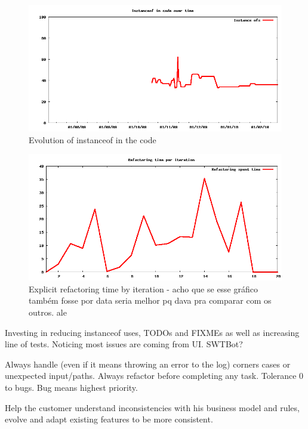 \documentclass[lnbip]{svmultln}
\begin{document}

\begin{figure}[hbt]
  \centerline{
    \includegraphics[width=120mm]{InstanceOfs.png}
  }
  \caption{Evolution of instanceof in the code }
  \label{fig:InstanceOfs}
\end{figure}

\begin{figure}[hbt]
  \centerline{
    \includegraphics[width=120mm]{refactoring.png}
  }
  \caption{Explicit refactoring time by iteration - acho que se esse
    gráfico também fosse por data seria melhor pq dava pra comparar
    com os outros. ale}%
  \label{fig:refactoring}
\end{figure}

Investing in reducing instanceof uses, TODOs and FIXMEs as well as
increasing line of tests. Noticing most issues are coming from
UI. SWTBot?

Always handle (even if it means throwing an error to the log) corners
cases or unexpected input/paths. Always refactor before completing any
task. Tolerance 0 to bugs. Bug means highest priority.

Help the customer understand inconsistencies with his business model
and rules, evolve and adapt existing features to be more consistent.
\end{document}
